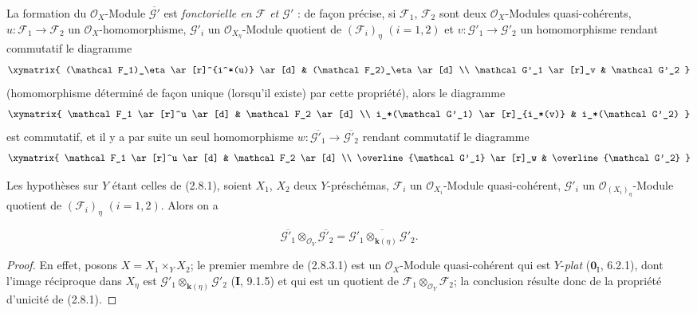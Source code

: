 \begin{env}[2.8.3]
\label{IV.2.8.3-fr}
La formation du $\mathcal O_X$-Module $\overline{\mathcal G'}$ est
\emph{fonctorielle en $\mathcal F$ et $\mathcal G'$} : de façon précise, si
$\mathcal F_1$, $\mathcal F_2$ sont deux $\mathcal O_X$-Modules
quasi-cohérents, $u:\mathcal F_1\to\mathcal F_2$ un
$\mathcal O_X$-homomorphisme, $\mathcal G'_i$ un
$\mathcal O_{X_\eta}$-Module quotient de $(\mathcal F_i)_\eta$ $(i=1,2)$ et
$v:\mathcal G'_1\to\mathcal G'_2$ un homomorphisme rendant commutatif le
diagramme
\[
\xymatrix{
(\mathcal F_1)_\eta \ar[r]^{i^*(u)} \ar[d] &
(\mathcal F_2)_\eta \ar[d] \\
\mathcal G'_1 \ar[r]_v & \mathcal G'_2
}
\]
(homomorphisme déterminé de façon unique (lorsqu'il existe) par cette
propriété), alors le diagramme
\[
\xymatrix{
\mathcal F_1 \ar[r]^u \ar[d] & \mathcal F_2 \ar[d] \\
i_*(\mathcal G'_1) \ar[r]_{i_*(v)} & i_*(\mathcal G'_2)
}
\]
est commutatif, et il y a par suite un seul homomorphisme
$w:\overline{\mathcal G'_1}\to\overline{\mathcal G'_2}$ rendant commutatif
le diagramme
\[
\xymatrix{
\mathcal F_1 \ar[r]^u \ar[d] & \mathcal F_2 \ar[d] \\
\overline{\mathcal G'_1} \ar[r]_w & \overline{\mathcal G'_2}
}
\]
\end{env}

\begin{proposition}[2.8.4]
\label{IV.2.8.4-fr}
Les hypothèses sur $Y$ étant celles de \textup{(2.8.1)}, soient $X_1$, $X_2$ deux
$Y$-préschémas, $\mathcal F_i$ un $\mathcal O_{X_i}$-Module
quasi-cohérent, $\mathcal G'_i$ un $\mathcal O_{(X_i)_\eta}$-Module quotient
de $(\mathcal F_i)_\eta$ $(i=1,2)$. Alors on a
\end{proposition}

\begin{env}[2.8.4.1]
\label{IV.2.8.4.1-fr}
\[
\overline{\mathcal G'_1}\otimes_{\mathcal O_Y}\overline{\mathcal G'_2}
=\overline{\mathcal G'_1\otimes_{\mathbf{k}(\eta)}\mathcal G'_2}.
\]
\end{env}

\begin{proof}
En effet, posons $X=X_1\times_Y X_2$; le premier membre de (2.8.3.1) est
un $\mathcal O_X$-Module quasi-cohérent qui est $Y$-\emph{plat}
($\mathbf{0}_{\mathrm I}$, 6.2.1), dont l'image réciproque dans $X_\eta$ est
$\mathcal G'_1\otimes_{\mathbf{k}(\eta)}\mathcal G'_2$ (\textbf{I}, 9.1.5) et qui est un
quotient de $\mathcal F_1\otimes_{\mathcal O_Y}\mathcal F_2$; la conclusion
résulte donc de la propriété d'unicité de (2.8.1).
\end{proof}

